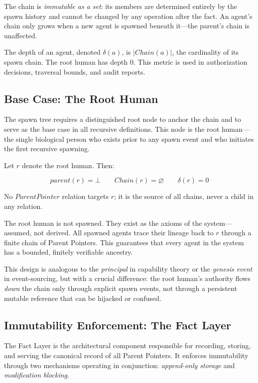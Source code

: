 The chain is \textit{immutable as a set}: its members are determined entirely by the spawn history and cannot be changed by any operation after the fact. An agent's chain only grows when a new agent is spawned beneath it—the parent's chain is unaffected.

The depth of an agent, denoted $\delta(a)$, is $|Chain(a)|$, the cardinality of its spawn chain. The root human has depth $0$. This metric is used in authorization decisions, traversal bounds, and audit reports.

\subsection{Base Case: The Root Human}

The spawn tree requires a distinguished root node to anchor the chain and to serve as the base case in all recursive definitions. This node is the root human—the single biological person who exists prior to any spawn event and who initiates the first recursive spawning.

\begin{property}
\label{prop:root-human}
Let $r$ denote the root human. Then:

\[
parent(r) = \bot \qquad Chain(r) = \varnothing \qquad \delta(r) = 0
\]

No $ParentPointer$ relation targets $r$; it is the source of all chains, never a child in any relation.
\end{property}

The root human is not spawned. They exist as the axioms of the system—assumed, not derived. All spawned agents trace their lineage back to $r$ through a finite chain of Parent Pointers. This guarantees that every agent in the system has a bounded, finitely verifiable ancestry.

This design is analogous to the \textit{principal} in capability theory or the \textit{genesis event} in event-sourcing, but with a crucial difference: the root human's authority flows \textit{down} the chain only through explicit spawn events, not through a persistent mutable reference that can be hijacked or confused.

\subsection{Immutability Enforcement: The Fact Layer}

The Fact Layer is the architectural component responsible for recording, storing, and serving the canonical record of all Parent Pointers. It enforces immutability through two mechanisms operating in conjunction: \textit{append-only storage} and \textit{modification blocking}.

